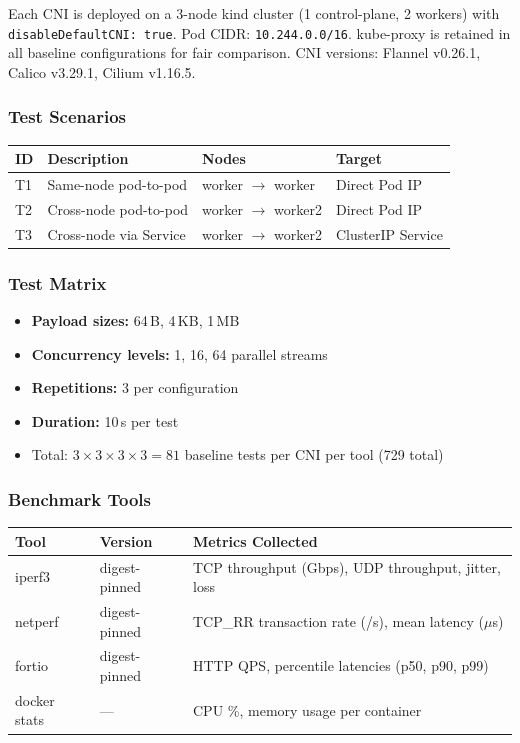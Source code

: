 \documentclass[11pt,a4paper]{article}
\begin{document}
Each CNI is deployed on a 3-node kind cluster (1 control-plane, 2 workers) with \texttt{disableDefaultCNI: true}. Pod CIDR: \texttt{10.244.0.0/16}. kube-proxy is retained in all baseline configurations for fair comparison. CNI versions: Flannel v0.26.1, Calico v3.29.1, Cilium v1.16.5.

\subsubsection{Test Scenarios}

\begin{longtable}{p{1.5cm}p{4cm}p{3cm}p{5cm}}
  \toprule
  \textbf{ID} & \textbf{Description} & \textbf{Nodes} & \textbf{Target} \\
  \midrule
  T1 & Same-node pod-to-pod & worker $\to$ worker & Direct Pod IP \\
  T2 & Cross-node pod-to-pod & worker $\to$ worker2 & Direct Pod IP \\
  T3 & Cross-node via Service & worker $\to$ worker2 & ClusterIP Service \\
  \bottomrule
\end{longtable}

\subsubsection{Test Matrix}

\begin{itemize}[nosep]
  \item \textbf{Payload sizes:} 64\,B, 4\,KB, 1\,MB
  \item \textbf{Concurrency levels:} 1, 16, 64 parallel streams
  \item \textbf{Repetitions:} 3 per configuration
  \item \textbf{Duration:} 10\,s per test
  \item Total: $3 \times 3 \times 3 \times 3 = 81$ baseline tests per CNI per tool (729 total)
\end{itemize}

\subsubsection{Benchmark Tools}

\begin{longtable}{p{2cm}p{3cm}p{8cm}}
  \toprule
  \textbf{Tool} & \textbf{Version} & \textbf{Metrics Collected} \\
  \midrule
  iperf3 & digest-pinned & TCP throughput (Gbps), UDP throughput, jitter, loss \\
  netperf & digest-pinned & TCP\_RR transaction rate (/s), mean latency ($\mu$s) \\
  fortio & digest-pinned & HTTP QPS, percentile latencies (p50, p90, p99) \\
  docker stats & --- & CPU \%, memory usage per container \\
  \bottomrule
\end{longtable}
\end{document}
